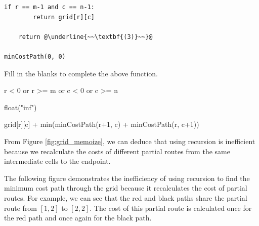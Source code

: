 \documentclass[11pt,addpoints,answers]{exam}
\begin{document}
\begin{questions}
\begin{parts}
\begin{lstlisting}[escapechar=@]
    if r == m-1 and c == n-1:
        return grid[r][c]

    return @\underline{~~\textbf{(3)}~~}@

minCostPath(0, 0)
\end{lstlisting}
\begin{subparts}
\subpart[3] Fill in the blanks to complete the above function.

    \begin{your_code_solution_outer}[height=1.75cm, width=\textwidth, title={Python code for missing field \textbf{(1)}}]
    \begin{your_code_solution}
    r < 0 or r >= m or c < 0 or c >= n
    \end{your_code_solution}
    \end{your_code_solution_outer}

    \begin{your_code_solution_outer}[height=1.75cm, width=\textwidth, title={Python code for missing field \textbf{(2)}}]
    \begin{your_code_solution}
    float("inf")
    \end{your_code_solution}
    \end{your_code_solution_outer}

    \begin{your_code_solution_outer}[height=1.75cm, width=\textwidth, title={Python code for missing field \textbf{(3)}}]
    \begin{your_code_solution}
    grid[r][c] + min(minCostPath(r+1, c) + minCostPath(r, c+1))
    \end{your_code_solution}
    \end{your_code_solution_outer}



\subpart[3] From Figure \ref{fig:grid_memoize}, we can deduce that using recursion is inefficient because we recalculate the costs of different partial routes from the same intermediate cells to the endpoint.

The following figure demonstrates the inefficiency of using recursion to find the minimum cost path through the grid because it recalculates the cost of partial routes. For example, we can see that the red and black paths share the partial route from $[1,2]$ to $[2,2]$. The cost of this partial route is calculated once for the red path and once again for the black path.


\end{subparts}
\end{parts}
\end{questions}
\end{document}
